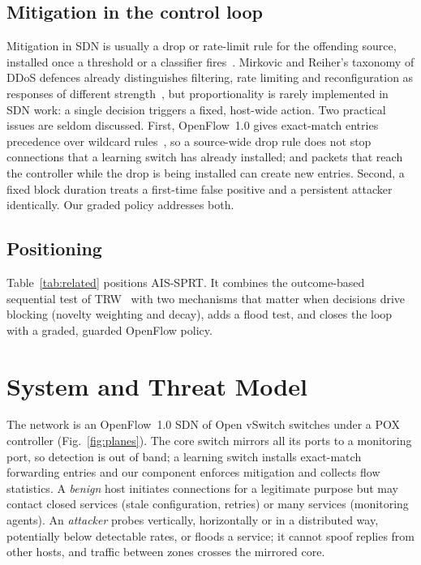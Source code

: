 \documentclass[conference]{IEEEtran}
\begin{document}
\subsection{Mitigation in the control loop}
Mitigation in SDN is usually a drop or rate-limit rule for the offending source, installed once a threshold or a
classifier fires~\cite{giotis2014combining,belachew2025robust}. Mirkovic and Reiher's taxonomy of DDoS defences already
distinguishes filtering, rate limiting and reconfiguration as responses of different strength~\cite{mirkovic2004taxonomy},
but proportionality is rarely implemented in SDN work: a single decision triggers a fixed, host-wide action. Two practical
issues are seldom discussed. First, OpenFlow~1.0 gives exact-match entries precedence over wildcard
rules~\cite{onf2009of10}, so a source-wide drop rule does not stop connections that a learning switch has already
installed; and packets that reach the controller while the drop is being installed can create new entries. Second, a
fixed block duration treats a first-time false positive and a persistent attacker identically. Our graded policy
addresses both.

\subsection{Positioning}
Table~\ref{tab:related} positions AIS-SPRT. It combines the outcome-based sequential test of
TRW~\cite{jung2004trw} with two mechanisms that matter when decisions drive blocking (novelty weighting and decay),
adds a flood test, and closes the loop with a graded, guarded OpenFlow policy.


\section{System and Threat Model}\label{sec:system}
The network is an OpenFlow~1.0 SDN of Open vSwitch switches under a POX controller (Fig.~\ref{fig:planes}). The core switch
mirrors all its ports to a monitoring port, so detection is out of band; a learning switch installs exact-match forwarding
entries and our component enforces mitigation and collects flow statistics. A \emph{benign} host initiates connections for a
legitimate purpose but may contact closed services (stale configuration, retries) or many services (monitoring agents). An
\emph{attacker} probes vertically, horizontally or in a distributed way, potentially below detectable rates, or floods a service; it cannot spoof
replies from other hosts, and traffic between zones crosses the mirrored core.
\end{document}
